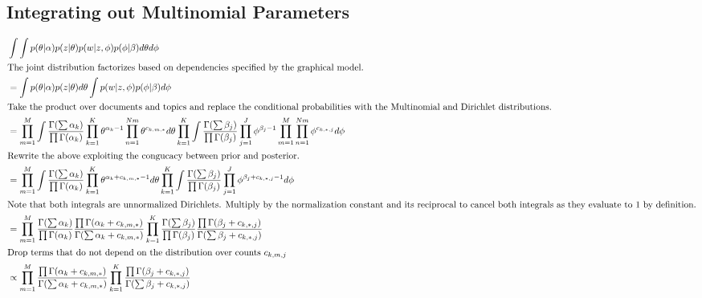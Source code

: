 \documentclass{article}%
\theoremstyle{definition}
\begin{document}
\subsection{Integrating out Multinomial Parameters}
\begin{align}
    &\int \int p(\theta | \alpha)p(z|\theta) p(w|z, \phi)p(\phi | \beta) d\theta d\phi \\
    \intertext{The joint distribution factorizes based on dependencies specified by the graphical model.}
    &=\int p(\theta | \alpha)p(z|\theta)d\theta \int p(w|z, \phi)p(\phi | \beta) d\phi \\
    \intertext{Take the product over documents and topics and replace the conditional probabilities with the Multinomial and Dirichlet distributions.}
    &= \prod_{m=1}^M \int \frac{\Gamma(\sum \alpha_k)}{\prod \Gamma(\alpha_k)} \prod_{k=1}^{K} \theta^{\alpha_k-1}\prod_{n=1}^{Nm} \theta^{c_{k,m,*}} d\theta \prod_{k=1}^{K} \int \frac{\Gamma(\sum \beta_j)}{\prod \Gamma(\beta_j)} \prod_{j=1}^{J} \phi^{\beta_j-1}\prod_{m=1}^{M} \prod_{n=1}^{Nm} \phi^{c_{k,*,j}} d\phi \\
    \intertext{Rewrite the above exploiting the congucacy between prior and posterior.} 
        &= \prod_{m=1}^M \int \frac{\Gamma(\sum \alpha_k)}{\prod \Gamma(\alpha_k)} \prod_{k=1}^{K} \theta^{\alpha_k + c_{k,m,*}-1} d\theta \prod_{k=1}^{K} \int \frac{\Gamma(\sum \beta_j)}{\prod \Gamma(\beta_j)} \prod_{j=1}^{J} \phi^{\beta_j + c_{k,*,j}-1} d\phi \\
    \intertext{Note that both integrals are unnormalized Dirichlets. Multiply by the normalization constant and its reciprocal to cancel both integrals as they evaluate to 1 by definition.}
        &= \prod_{m=1}^M \frac{\Gamma(\sum \alpha_k)}{\prod \Gamma(\alpha_k)}\frac{\prod \Gamma(\alpha_k + c_{k,m,*})}{\Gamma(\sum \alpha_k + c_{k,m,*})} \prod_{k=1}^{K} \frac{\Gamma(\sum \beta_j)}{\prod \Gamma(\beta_j)} \frac{\prod \Gamma(\beta_j + c_{k,*,j})}{\Gamma(\sum \beta_j + c_{k,*,j}) } \\
    \intertext{Drop terms that do not depend on the distribution over counts $c_{k,m,j}$}
        &\propto \prod_{m=1}^M \frac{\prod \Gamma(\alpha_k + c_{k,m,*})}{\Gamma(\sum \alpha_k + c_{k,m,*})} \prod_{k=1}^{K} \frac{\prod \Gamma(\beta_j + c_{k,*,j})}{\Gamma(\sum \beta_j + c_{k,*,j}) } \\

\end{align}
\end{document}
